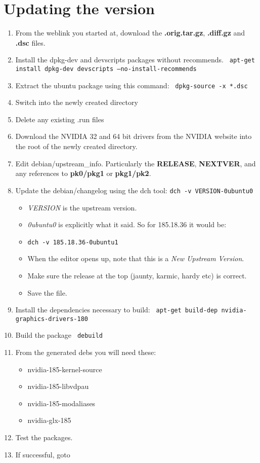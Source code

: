 \documentclass[letterpaper,10pt,titlepage]{article}
\begin{document}
\section{Updating the version} \label{updating}
\begin{enumerate}
\item From the weblink you started at, download the \textbf{.orig.tar.gz}, \textbf{.diff.gz} and \textbf{.dsc} files.
\item Install the dpkg-dev and devscripts packages without recommends.
  \newline   
  \texttt{ apt-get install dpkg-dev devscripts --no-install-recommends}
\item Extract the ubuntu package using this command:
  \newline 
  \texttt{ dpkg-source -x *.dsc}
\item Switch into the newly created directory
\item Delete any existing .run files
\item Download the NVIDIA 32 and 64 bit drivers from the NVIDIA website into the root of the newly created directory.
\item Edit debian/upstream_info.  Particularly the \textbf{RELEASE}, \textbf{NEXTVER}, and any references to \textbf{pk0/pkg1} or \textbf{pkg1/pk2}.
\item Update the debian/changelog using the dch tool: 
  \newline 
  \texttt{dch -v VERSION-0ubuntu0}
  \begin {itemize}
    \item \textit{VERSION} is the upstream version.
    \item \textit{0ubuntu0} is explicitly what it said.  So for 185.18.36 it would be:
    \item \texttt{dch -v 185.18.36-0ubuntu1}
    \item  When the editor opens up, note that this is a \textit{New Upstream Version}.
    \item  Make sure the release at the top (jaunty, karmic, hardy etc) is correct.
    \item Save the file.
  \end{itemize}

\item Install the dependencies necessary to build:
  \newline
  \texttt{ apt-get build-dep nvidia-graphics-drivers-180}
\item Build the package
  \newline
  \texttt{ debuild}
\item From the generated debs you will need these:
  \begin{itemize}
    \item nvidia-185-kernel-source
    \item nvidia-185-libvdpau
    \item nvidia-185-modaliases
    \item nvidia-glx-185
  \end{itemize}
\item Test the packages.
\item If successful, goto 
\end{enumerate}
\end{document}
